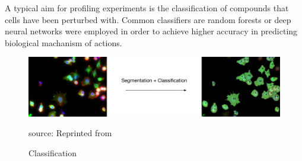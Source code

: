 A typical aim for profiling experiments is the classification of compounds that cells have been perturbed with. Common classifiers are random forests or deep neural networks were employed in order to achieve higher accuracy in predicting biological machanism of actions.


\begin{figure}[H]
	\centering
	\includegraphics[width=0.8\linewidth]{bilder/cells/classification.png}
	\caption{Classification}
	source: Reprinted from \cite{Pau}
	\label{fig:Classification}
\end{figure}





